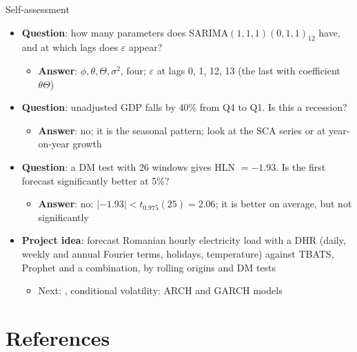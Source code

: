 \begin{frame}{Self-assessment}
\itemsize{\footnotesize}
\begin{itemize}
    \item \textbf{Question}: how many parameters does SARIMA$(1,1,1)(0,1,1)_{12}$ have, and at which lags does $\varepsilon$ appear?
    \begin{itemize}
        \item \textbf{Answer}: $\phi, \theta, \Theta, \sigma^2$, four; $\varepsilon$ at lags 0, 1, 12, 13 (the last with coefficient $\theta\Theta$)
    \end{itemize}
    \item \textbf{Question}: unadjusted GDP falls by 40\% from Q4 to Q1. Is this a recession?
    \begin{itemize}
        \item \textbf{Answer}: no; it is the seasonal pattern; look at the SCA series or at year-on-year growth
    \end{itemize}
    \item \textbf{Question}: a DM test with 26 windows gives HLN $= -1.93$. Is the first forecast significantly better at 5\%?
    \begin{itemize}
        \item \textbf{Answer}: no: $|-1.93| < t_{0.975}(25) = 2.06$; it is better on average, but not significantly
    \end{itemize}
    \item \textbf{Project idea}: forecast Romanian hourly electricity load with a DHR (daily, weekly and annual Fourier terms, holidays, temperature) against TBATS, Prophet and a combination, by rolling origins and DM tests
    \begin{itemize}
        \item Next: , conditional volatility: ARCH and GARCH models
    \end{itemize}
\end{itemize}
\end{frame}


\section{References}


